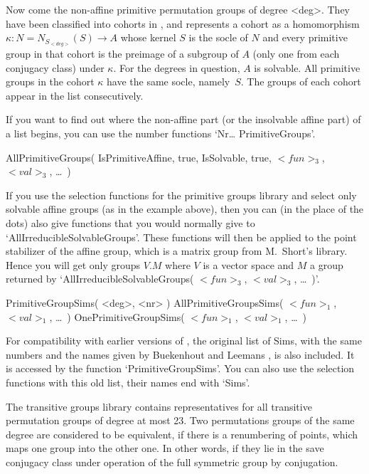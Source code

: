 Now come the   non-affine primitive permutation  groups  of degree <deg>.
They have been  classified  into cohorts in  \cite{DixonMortimer88},  and
{\GAP}    represents a     cohort   as a     homomorphism   $\kappa\colon
N=N_{S_{<deg>}}(S)\to A$ whose kernel $S$  is the socle  of $N$ and every
primitive group in that cohort is the preimage of a subgroup of $A$ (only
one from   each conjugacy  class)  under $\kappa$.   For the  degrees  in
question,  $A$ is solvable. All  primitive groups in  the cohort $\kappa$
have the same socle, namely~$S$. The groups  of each cohort appear in the
list consecutively.

If  you want to  find out where  the non-affine  part  (or the insolvable
affine part) of a list begins, you  can use the number functions `Nr\dots
PrimitiveGroups'.

\)AllPrimitiveGroups( IsPrimitiveAffine, true, IsSolvable, true, %
                      $<fun>_3$, $<val>_3$, \dots\ )

If you use  the selection functions  for the primitive groups library and
select  only solvable affine  groups (as in  the example above), then you
can (in  the   place of the dots)    also give functions  that  you would
normally give   to `AllIrreducibleSolvableGroups'.  These functions  will
then be applied to the  point stabilizer of the affine  group, which is a
matrix group  from  M.~Short's library.  Hence you will  get only  groups
$V.M$  where  $V$ is  a    vector space and    $M$  a group  returned  by
`AllIrreducibleSolvableGroups( $<fun>_3$, $<val>_3$, \dots\ )'.

\>PrimitiveGroupSims( <deg>, <nr> )
\>AllPrimitiveGroupsSims( $<fun>_1$, $<val>_1$, \dots\ )
\>OnePrimitiveGroupSims( $<fun>_1$, $<val>_1$, \dots\ )

For  compatibility with earlier versions  of {\GAP}, the original list of
Sims, with the same numbers and the names given by Buekenhout and Leemans
\cite{BuekenhoutLeemans96},  is also   included.  It is accessed  by  the
function  `PrimitiveGroupSims'. You can also  use the selection functions
with this old list, their names end with `Sims'.


The transitive groups library contains representatives for all transitive
permutation groups of degree at most  23.  Two permutations groups of the
same degree are considered to be equivalent, if there is a renumbering of
points, which maps one group into the other one.  In other words, if they
lie in the save  conjugacy class  under operation  of the  full symmetric
group by conjugation.

